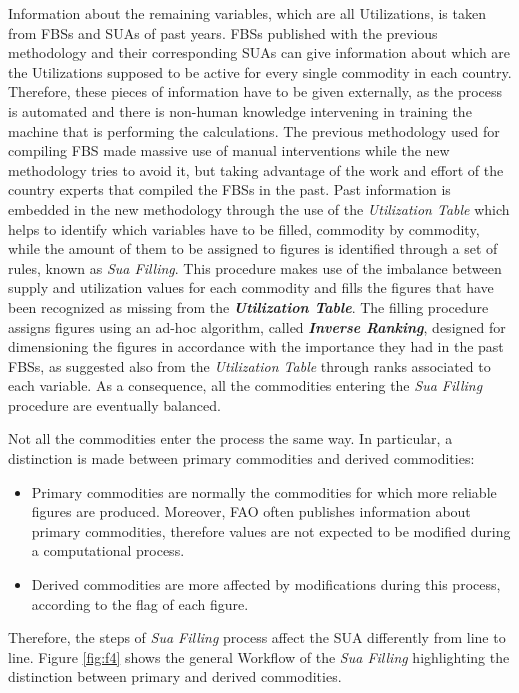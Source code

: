 \documentclass[]{article}
\providecommand{\tightlist}{%
  \setlength{\itemsep}{0pt}\setlength{\parskip}{0pt}}
\begin{document}
Information about the remaining variables, which are all Utilizations,
is taken from FBSs and SUAs of past years. FBSs published with the
previous methodology and their corresponding SUAs can give information
about which are the Utilizations supposed to be active for every single
commodity in each country.\\
Therefore, these pieces of information have to be given externally, as
the process is automated and there is non-human knowledge intervening in
training the machine that is performing the calculations. The previous
methodology used for compiling FBS made massive use of manual
interventions while the new methodology tries to avoid it, but taking
advantage of the work and effort of the country experts that compiled
the FBSs in the past. Past information is embedded in the new
methodology through the use of the \emph{Utilization Table} which helps
to identify which variables have to be filled, commodity by commodity,
while the amount of them to be assigned to figures is identified through
a set of rules, known as \emph{Sua Filling}. This procedure makes use of
the imbalance between supply and utilization values for each commodity
and fills the figures that have been recognized as missing from the
\textbf{\emph{Utilization Table}}. The filling procedure assigns figures
using an ad-hoc algorithm, called \textbf{\emph{Inverse Ranking}},
designed for dimensioning the figures in accordance with the importance
they had in the past FBSs, as suggested also from the \emph{Utilization
Table} through ranks associated to each variable. As a consequence, all
the commodities entering the \emph{Sua Filling} procedure are eventually
balanced.

Not all the commodities enter the process the same way. In particular, a
distinction is made between primary commodities and derived commodities:

\begin{itemize}
\tightlist
\item
  Primary commodities are normally the commodities for which more
  reliable figures are produced. Moreover, FAO often publishes
  information about primary commodities, therefore values are not
  expected to be modified during a computational process.
\item
  Derived commodities are more affected by modifications during this
  process, according to the flag of each figure.
\end{itemize}

Therefore, the steps of \emph{Sua Filling} process affect the SUA
differently from line to line. Figure \ref{fig:f4} shows the general
Workflow of the \emph{Sua Filling} highlighting the distinction between
primary and derived commodities.
\end{document}
